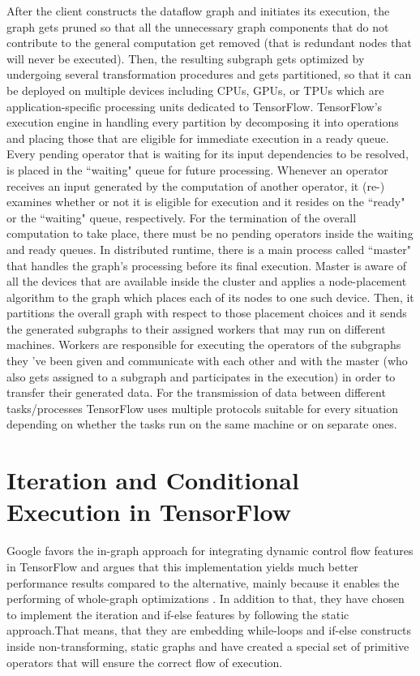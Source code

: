 \documentclass[ack,preface]{dithesis}
\begin{document}
After the client constructs the dataflow graph and initiates its execution, the graph gets pruned so that all the unnecessary graph components that do not contribute to the general computation get removed (that is redundant nodes that will never be executed). Then, the resulting subgraph gets optimized by undergoing several transformation procedures and gets partitioned, so that it can be deployed on multiple devices including CPUs, GPUs, or TPUs which are application-specific processing units dedicated to TensorFlow. TensorFlow's execution engine in handling every partition by decomposing it into operations and placing those that are eligible for immediate execution in a ready queue. Every pending operator that is waiting for its input dependencies to be resolved, is placed in the ``waiting" queue for future processing. Whenever an operator receives an input generated by the computation of another operator, it (re-) examines whether or not it is eligible for execution and it resides on the ``ready" or the ``waiting" queue, respectively. For the termination of the overall computation to take place, there must be no pending operators inside the waiting and ready queues.
In distributed runtime, there is a main process called ``master" that handles the graph's processing before its final execution. Master is aware of all the devices that are available inside the cluster 
and  applies a node-placement algorithm to the graph which places each of its nodes to one such device. Then, it partitions the overall graph with respect to those placement choices and it sends the generated subgraphs to their assigned workers that may run on different machines. Workers are responsible for executing the operators of the subgraphs they 've been given and communicate with each other and with the master (who also gets assigned to a subgraph and participates in the execution) in order to transfer their generated data. For the transmission of data  between different tasks/processes TensorFlow uses multiple protocols suitable for every situation depending on whether the tasks run on the same machine or on separate ones.

    \section{Iteration and Conditional Execution in TensorFlow}
Google favors the in-graph approach for integrating dynamic control flow features in TensorFlow and argues that this implementation yields much better performance results compared to the alternative, mainly because it enables the performing of whole-graph optimizations \cite{Yu:2018}. In addition to that, they have chosen to implement the iteration and if-else features by following the static approach.That means, that they are embedding while-loops and if-else constructs inside non-transforming, static graphs and have created a special set of primitive operators that will ensure the correct flow of execution.
\end{document}
